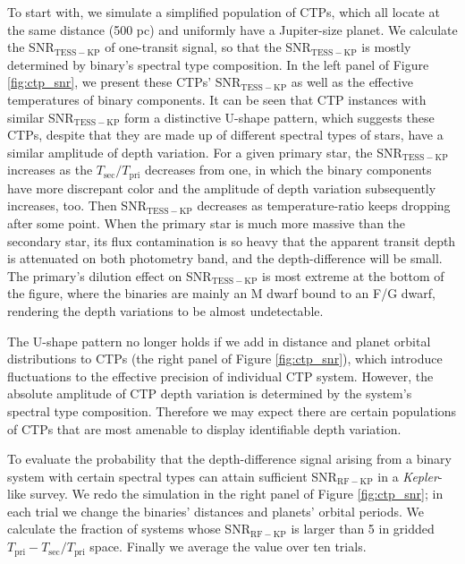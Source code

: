 \documentclass{aastex63}
\begin{document}
    To start with, we simulate a simplified population of CTPs, which all locate at the same distance (500 pc) and uniformly have a Jupiter-size planet. We calculate the SNR$_\mathrm{TESS-KP}$ of one-transit signal, so that the SNR$_\mathrm{TESS-KP}$ is mostly determined by binary's spectral type composition. In the left panel of Figure \ref{fig:ctp_snr}, we present these CTPs' SNR$_\mathrm{TESS-KP}$ as well as the effective temperatures of binary components. It can be seen that CTP instances with similar SNR$_\mathrm{TESS-KP}$ form a distinctive U-shape pattern, which suggests these CTPs, despite that they are made up of different spectral types of stars, have a similar amplitude of depth variation. For a given primary star, the SNR$_\mathrm{TESS-KP}$ increases as the $T_\mathrm{sec}/T_\mathrm{pri}$ decreases from one, in which the binary components have more discrepant color and the amplitude of depth variation subsequently increases, too. Then SNR$_\mathrm{TESS-KP}$ decreases as temperature-ratio keeps dropping after some point. When the primary star is much more massive than the secondary star, its flux contamination is so heavy that the apparent transit depth is attenuated on both photometry band, and the depth-difference will be small. The primary's dilution effect on SNR$_\mathrm{TESS-KP}$ is most extreme at the bottom of the figure, where the binaries are mainly an M dwarf bound to an F/G dwarf, rendering the depth variations to be almost undetectable. 

    The U-shape pattern no longer holds if we add in distance and planet orbital distributions to CTPs (the right panel of Figure \ref{fig:ctp_snr}), which introduce fluctuations to the effective precision of individual CTP system. However, the absolute amplitude of CTP depth variation is determined by the system's spectral type composition. Therefore we may expect there are certain populations of CTPs that are most amenable to display identifiable depth variation. 
    
    To evaluate the probability that the depth-difference signal arising from a binary system with certain spectral types can attain sufficient SNR$_\mathrm{RF-KP}$ in a \emph{Kepler}-like survey. We redo the simulation in the right panel of Figure \ref{fig:ctp_snr}; in each trial we change the binaries' distances and planets' orbital periods. We calculate the fraction of systems whose SNR$_\mathrm{RF-KP}$ is larger than 5 in gridded $T_\mathrm{pri}-T_\mathrm{sec}/T_\mathrm{pri}$ space.  Finally we average the value over ten trials.  
    
\end{document}
